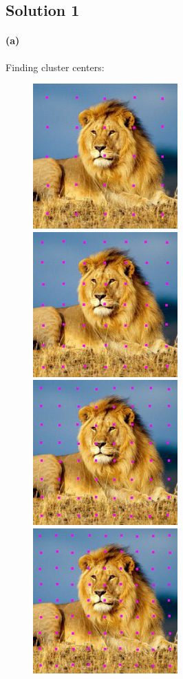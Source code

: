 \documentclass{article}
\newcommand{\solution}[1]{\clearpage \subsection*{Solution #1}}  %
\newcommand{\spart}[1]{\paragraph{(#1)}}
\begin{document}

\solution{1}

\spart{a} 
Finding cluster centers:
\begin{figure}[h!]
  \centering
	\includegraphics[height=15em]{code/outputs/prob1a_25_centers.jpg}
	\includegraphics[height=15em]{code/outputs/prob1a_49_centers.jpg}
	\includegraphics[height=15em]{code/outputs/prob1a_64_centers.jpg}
	\includegraphics[height=15em]{code/outputs/prob1a_81_centers.jpg}

\end{figure}
\end{document}

